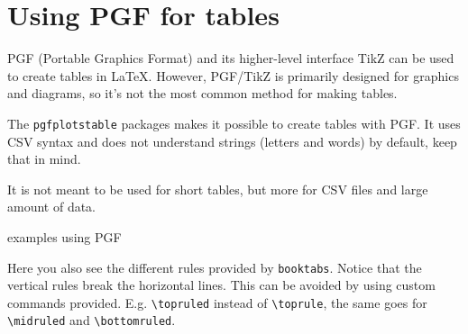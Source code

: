 
\section{Using PGF for tables}
\label{sec:pgf-table}

PGF (Portable Graphics Format) and its higher-level interface TikZ can be used to create tables in LaTeX. However, PGF/TikZ is primarily designed for graphics and diagrams, so it's not the most common method for making tables.

The \verb|pgfplotstable| packages makes it possible to create tables with PGF. It uses CSV syntax and does not understand strings (letters and words) by default, keep that in mind.

It is not meant to be used for short tables, but more for CSV files and large amount of data.

\begin{table}[H]
    \centering\caption{examples using PGF}
    \hskip 1cm
    \hskip 1cm
\end{table}

Here you also see the different rules provided by \texttt{booktabs}. Notice that the vertical rules break the horizontal lines. This can be avoided by using custom commands provided. E.g. \verb|\topruled| instead of \verb|\toprule|, the same goes for \verb|\midruled| and \verb|\bottomruled|.